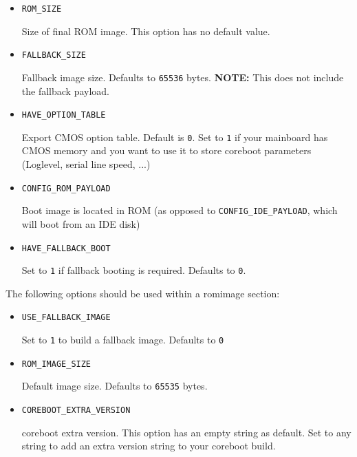 \documentclass[titlepage,12pt]{article}
\begin{document}
\begin{itemize}
\item \begin{verbatim}ROM_SIZE\end{verbatim}

Size of final ROM image. This option has no default value.

\item \begin{verbatim}FALLBACK_SIZE\end{verbatim}

Fallback image size. Defaults to \texttt{65536} bytes. \textbf{NOTE:} 
This does not include the fallback payload.

\item \begin{verbatim}HAVE_OPTION_TABLE\end{verbatim}

Export CMOS option table. Default is \texttt{0}. Set to \texttt{1} if
your mainboard has CMOS memory and you want to use it to store
coreboot parameters (Loglevel, serial line speed, ...)

\item \begin{verbatim}CONFIG_ROM_PAYLOAD\end{verbatim}

Boot image is located in ROM (as opposed to \texttt{CONFIG\_IDE\_PAYLOAD}, which
will boot from an IDE disk)

\item \begin{verbatim}HAVE_FALLBACK_BOOT\end{verbatim}

Set to \texttt{1} if fallback booting is required. Defaults to
\texttt{0}.

\end{itemize}


The following options should be used within a romimage section:

\begin{itemize}

\item \begin{verbatim}USE_FALLBACK_IMAGE\end{verbatim}

Set to \texttt{1} to build a fallback image. Defaults to \texttt{0}

\item \begin{verbatim}ROM_IMAGE_SIZE\end{verbatim}

Default image size. Defaults to \texttt{65535} bytes.

\item \begin{verbatim}COREBOOT_EXTRA_VERSION\end{verbatim}

coreboot extra version. This option has an empty string as default. Set
to any string to add an extra version string to your coreboot build.

\end{itemize}
\end{document}
